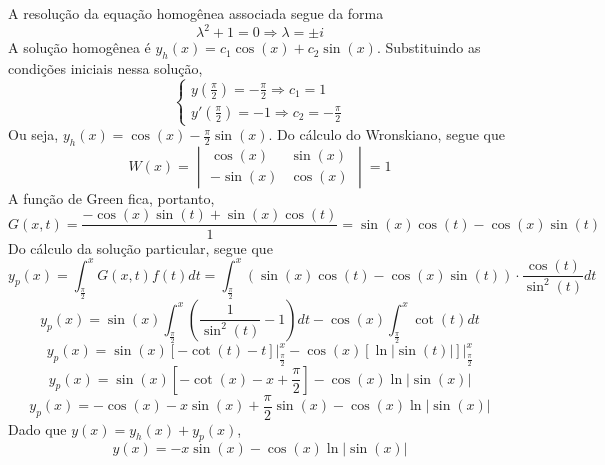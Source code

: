 \documentclass[oneside,12pt,a4paper]{report}
\begin{document}
    \begin{resolucao}
        A resolução da equação homogênea associada segue da forma
        \[\lambda^2+1=0\Rightarrow\lambda=\pm i\]
        A solução homogênea é $y_h(x)=c_1\cos(x)+c_2\sin(x)$. Substituindo as condições iniciais nessa solução,
        \[\begin{cases}
            y(\frac{\pi}{2})=-\frac{\pi}{2}\Rightarrow c_1=1\\
            y'(\frac{\pi}{2})=-1\Rightarrow c_2=-\frac{\pi}{2}
        \end{cases}\]
        Ou seja, $y_h(x)=\cos(x)-\frac{\pi}{2}\sin(x)$. Do cálculo do Wronskiano, segue que
        \[W(x)=\begin{vmatrix}
        \cos(x)      & \sin(x)\\
        -\sin(x) & \cos(x)
    \end{vmatrix}=1\]
    A função de Green fica, portanto,
    \[G(x, t)=\frac{-\cos(x)\sin(t)+\sin(x)\cos(t)}{1}=\sin(x)\cos(t)-\cos(x)\sin(t)\]
    Do cálculo da solução particular, segue que
    \[y_p(x)=\int_{\frac{\pi}{2}}^{x}G(x,t)f(t)dt=\int_{\frac{\pi}{2}}^{x}(\sin(x)\cos(t)-\cos(x)\sin(t))\cdot\frac{\cos(t)}{\sin^2(t)}dt\]
    \[y_p(x)=\sin(x)\int_{\frac{\pi}{2}}^{x}\left(\frac{1}{\sin^2(t)}-1\right)dt-\cos(x)\int_{\frac{\pi}{2}}^{x}\cot(t)dt\]
    \[y_p(x)=\sin(x)[-\cot(t)-t]\rvert^x_\frac{\pi}{2}-\cos(x)[\ln|\sin(t)|]\rvert^x_\frac{\pi}{2}\]
    \[y_p(x)=\sin(x)[-\cot(x)-x+\frac{\pi}{2}]-\cos(x)\ln|\sin(x)|\]
    \[y_p(x)=-\cos(x)-x\sin(x)+\frac{\pi}{2}\sin(x)-\cos(x)\ln|\sin(x)|\]
    Dado que $y(x)=y_h(x)+y_p(x)$, 
    \[\boxed{y(x)=-x\sin(x)-\cos(x)\ln|\sin(x)|}\]
    \end{resolucao}
\end{document}

